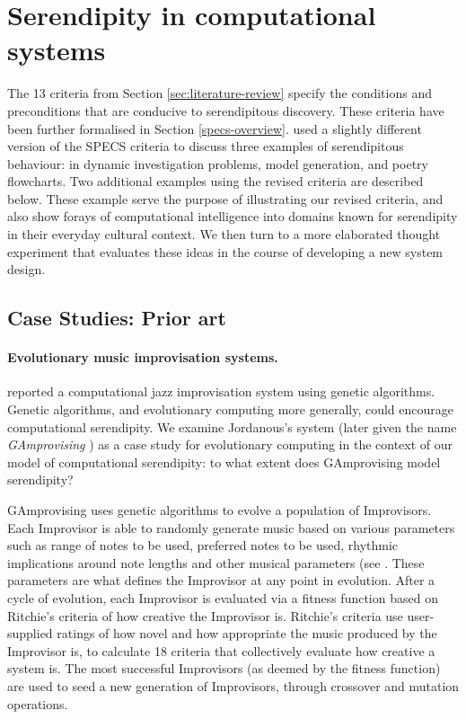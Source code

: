 \section{Serendipity in computational systems} \label{sec:computational-serendipity}

The 13 criteria from Section \ref{sec:literature-review} specify the
conditions and preconditions that are conducive to serendipitous
discovery.  These criteria have been further formalised
in Section \ref{specs-overview}.
% 
 used a slightly different version of the
SPECS criteria to discuss three examples of serendipitous behaviour:
in dynamic investigation problems, model generation, and poetry
flowcharts.  Two additional examples using the revised criteria are
described below.  These example serve the purpose of illustrating our
revised criteria, and also show forays of computational intelligence
into domains known for serendipity in their everyday cultural context.
We then turn to a more elaborated thought experiment that evaluates
these ideas in the course of developing a new system design.

% 

\subsection{Case Studies: Prior art}

\paragraph{Evolutionary music improvisation systems.}

 reported a computational jazz improvisation system using genetic algorithms. Genetic algorithms, and evolutionary computing more generally, could encourage computational serendipity. We examine Jordanous's system (later given the name {\em GAmprovising} \cite{jordanous:12}) as a case study for evolutionary computing in the context of our model of computational serendipity: to what extent does GAmprovising model serendipity?

GAmprovising uses genetic algorithms to evolve a population of Improvisors. Each Improvisor is able to randomly generate music based on various parameters such as range of notes to be used, preferred notes to be used, rhythmic implications around note lengths and other musical parameters (see \cite{jordanous10}. These parameters are what defines the Improvisor at any point in evolution. After a cycle of evolution, each Improvisor is evaluated via a fitness function based on Ritchie's criteria \cite{ritchie07} of how creative the Improvisor is. Ritchie's criteria use user-supplied ratings of how novel and how appropriate the music produced by the Improvisor is, to calculate 18 criteria that collectively evaluate how creative a system is. The most successful Improvisors (as deemed by the fitness function) are used to seed a new generation of Improvisors, through crossover and mutation operations.

